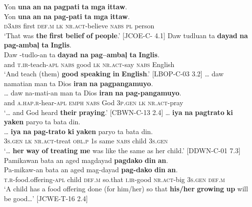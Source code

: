 \ea
Yon  \textbf{una}  \textbf{an}  \textbf{na}  \textbf{pagpati}  \textbf{ta}  \textbf{mga}  \textbf{ittaw}. \\\smallskip
 \gll Yon  \textbf{una}  \textbf{an}  \textbf{na}  \textbf{pag-pati}  \textbf{ta}  \textbf{mga}  \textbf{ittaw}. \\
\textsc{d}3\textsc{abs}  first  \textsc{def.m}  \textsc{lk}  \textsc{nr.act}-believe  \textsc{nabs}  \textsc{pl}  person \\
\glt ‘That was \textbf{the} \textbf{first} \textbf{belief} \textbf{of} \textbf{people}.’ [JCOE-C- 4.1]
\z
\ea
Daw  tudluan  ta  \textbf{dayad}  \textbf{na}  \textbf{pag-ambaļ}  \textbf{ta}  \textbf{Inglis}. \\\smallskip
 \gll Daw  \emptyset{}-tudlo-an  ta  \textbf{dayad}  \textbf{na}  \textbf{pag--ambaļ}  \textbf{ta}  \textbf{Inglis}. \\
and  \textsc{t.ir}-teach-\textsc{apl}  \textsc{nabs}  good  \textsc{lk} \textsc{nr.act-}say  \textsc{nabs}  English \\
\glt ‘And teach (them) \textbf{good} \textbf{speaking} \textbf{in} \textbf{English}.’ [LBOP-C-03 3.2]
\z
\ea
… daw  namatian  man  ta  Dios  \textbf{iran}  \textbf{na} \textbf{pagpangamuyo}. \\\smallskip
 \gll … daw  na-mati-an  man  ta  Dios  \textbf{iran}  \textbf{na} \textbf{pag-pangamuyo}. \\
{} and  \textsc{a.hap.r}-hear-\textsc{apl}  \textsc{emph}  \textsc{nabs}  God  3\textsc{p.gen}  \textsc{lk}  \textsc{nr.act}-pray \\
\glt ‘… and God heard \textbf{their} \textbf{praying}.’ [CBWN-C-13 2.4]
\z
\ea
 … \textbf{iya}  \textbf{na}  \textbf{pagtrato}  \textbf{ki}  \textbf{yaken}  paryo  ta  bata  din. \\\smallskip
 \gll … \textbf{iya}  \textbf{na}  \textbf{pag-trato}  \textbf{ki}  \textbf{yaken}  paryo  ta  bata  din. \\
{} 3\textsc{s.gen}  \textsc{lk}  \textsc{nr.act-}treat  \textsc{obl.p}  1s  same  \textsc{nabs}  child  3\textsc{s.gen} \\
\glt ‘… \textbf{her} \textbf{way} \textbf{of} \textbf{treating} \textbf{me} was like the same as her child.’ [DDWN-C-01 7.3]
\z
\ea
Pamikawan  bata  an  aged  magdayad  \textbf{pagdako}  \textbf{din}  \textbf{an}. \\\smallskip
 \gll Pa-mikaw-an  bata  an  aged  mag-dayad  \textbf{pag-dako}  \textbf{din}  \textbf{an}. \\
\textsc{t.r}-food.offering-\textsc{apl}  child  \textsc{def.m}  so.that  \textsc{i.ir}-good  \textsc{nr.act}-big  3\textsc{s.gen}  \textsc{def.m} \\
\glt ‘A child has a food offering done (for him/her) so that \textbf{his/her} \textbf{growing} \textbf{up} will be good…’ [JCWE-T-16 2.4]
\z


